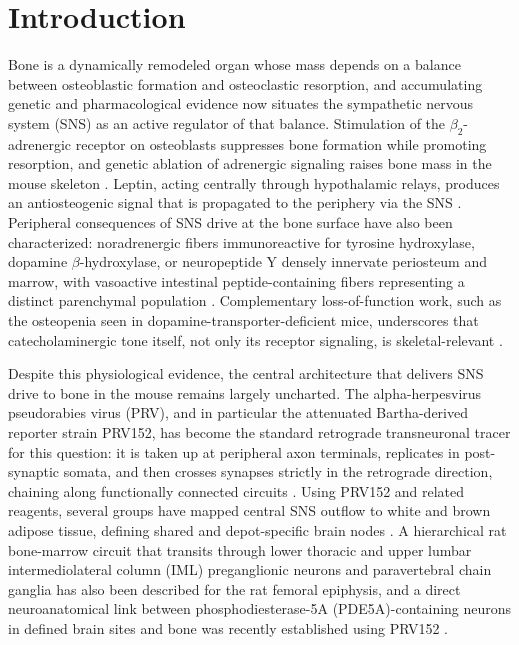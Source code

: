 
\section{Introduction}

Bone is a dynamically remodeled organ whose mass depends on a balance between osteoblastic formation and osteoclastic resorption, and accumulating genetic and pharmacological evidence now situates the sympathetic nervous system (SNS) as an active regulator of that balance. Stimulation of the \(\beta_2\)-adrenergic receptor on osteoblasts suppresses bone formation while promoting resorption, and genetic ablation of adrenergic signaling raises bone mass in the mouse skeleton \cite{takeda2002leptin,elefteriou2005leptin}. Leptin, acting centrally through hypothalamic relays, produces an antiosteogenic signal that is propagated to the periphery via the SNS \cite{ducy2000leptin,flak2016cns}. Peripheral consequences of SNS drive at the bone surface have also been characterized: noradrenergic fibers immunoreactive for tyrosine hydroxylase, dopamine \(\beta\)-hydroxylase, or neuropeptide Y densely innervate periosteum and marrow, with vasoactive intestinal peptide-containing fibers representing a distinct parenchymal population \cite{hohmann1986innervation,togari2010control}. Complementary loss-of-function work, such as the osteopenia seen in dopamine-transporter-deficient mice, underscores that catecholaminergic tone itself, not only its receptor signaling, is skeletal-relevant \cite{bliziotes2000bone,zhu2018cortical}.

Despite this physiological evidence, the central architecture that delivers SNS drive to bone in the mouse remains largely uncharted. The alpha-herpesvirus pseudorabies virus (PRV), and in particular the attenuated Bartha-derived reporter strain PRV152, has become the standard retrograde transneuronal tracer for this question: it is taken up at peripheral axon terminals, replicates in post-synaptic somata, and then crosses synapses strictly in the retrograde direction, chaining along functionally connected circuits \cite{card2001transneuronal,ekstrand2008alpha,card1995influence}. Using PRV152 and related reagents, several groups have mapped central SNS outflow to white and brown adipose tissue, defining shared and depot-specific brain nodes \cite{bamshad1998central,bamshad1999cns,bartness1998innervation,bartness2014neural,ryu2014short,song2008mc4r,shrestha2010central,brito2007differential,adler2012neurochemical}. A hierarchical rat bone-marrow circuit that transits through lower thoracic and upper lumbar intermediolateral column (IML) preganglionic neurons and paravertebral chain ganglia has also been described for the rat femoral epiphysis, and a direct neuroanatomical link between phosphodiesterase-5A (PDE5A)-containing neurons in defined brain sites and bone was recently established using PRV152 \cite{kim2020pde5a}.

